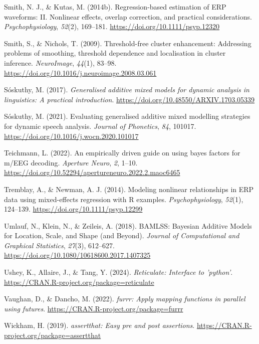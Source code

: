 \documentclass[
  doc,
  floatsintext,
  longtable,
  a4paper,
  nolmodern,
  notxfonts,
  notimes,
  colorlinks=true,linkcolor=blue,citecolor=blue,urlcolor=blue]{apa7}
\newlength{\cslhangindent}
\newenvironment{CSLReferences}[2] %
 {\begin{list}{}{%
  \setlength{\itemindent}{0pt}
  \setlength{\leftmargin}{0pt}
  \setlength{\parsep}{0pt}
  \ifodd #1
   \setlength{\leftmargin}{\cslhangindent}
   \setlength{\itemindent}{-1\cslhangindent}
  \fi
  \setlength{\itemsep}{#2\baselineskip}}}
 {\end{list}}
\begin{document}
\begin{CSLReferences}{1}{0}
Smith, N. J., \& Kutas, M. (2014b). Regression{-}based estimation of ERP
waveforms: II. Nonlinear effects, overlap correction, and practical
considerations. \emph{Psychophysiology}, \emph{52}(2), 169--181.
\url{https://doi.org/10.1111/psyp.12320}

Smith, S., \& Nichols, T. (2009). Threshold-free cluster enhancement:
Addressing problems of smoothing, threshold dependence and localisation
in cluster inference. \emph{NeuroImage}, \emph{44}(1), 83--98.
\url{https://doi.org/10.1016/j.neuroimage.2008.03.061}

Sóskuthy, M. (2017). \emph{Generalised additive mixed models for dynamic
analysis in linguistics: A practical introduction}.
\url{https://doi.org/10.48550/ARXIV.1703.05339}

Sóskuthy, M. (2021). Evaluating generalised additive mixed modelling
strategies for dynamic speech analysis. \emph{Journal of Phonetics},
\emph{84}, 101017. \url{https://doi.org/10.1016/j.wocn.2020.101017}

Teichmann, L. (2022). An empirically driven guide on using bayes factors
for m/EEG decoding. \emph{Aperture Neuro}, \emph{2}, 1--10.
\url{https://doi.org/10.52294/apertureneuro.2022.2.maoc6465}

Tremblay, A., \& Newman, A. J. (2014). Modeling nonlinear relationships
in ERP data using mixed{-}effects regression with R examples.
\emph{Psychophysiology}, \emph{52}(1), 124--139.
\url{https://doi.org/10.1111/psyp.12299}

Umlauf, N., Klein, N., \& Zeileis, A. (2018). BAMLSS: Bayesian Additive
Models for Location, Scale, and Shape (and Beyond). \emph{Journal of
Computational and Graphical Statistics}, \emph{27}(3), 612--627.
\url{https://doi.org/10.1080/10618600.2017.1407325}

Ushey, K., Allaire, J., \& Tang, Y. (2024). \emph{Reticulate: Interface
to 'python'}. \url{https://CRAN.R-project.org/package=reticulate}

Vaughan, D., \& Dancho, M. (2022). \emph{{furrr}: Apply mapping
functions in parallel using futures}.
\url{https://CRAN.R-project.org/package=furrr}

Wickham, H. (2019). \emph{{assertthat}: Easy pre and post assertions}.
\url{https://CRAN.R-project.org/package=assertthat}


\end{CSLReferences}
\end{document}
